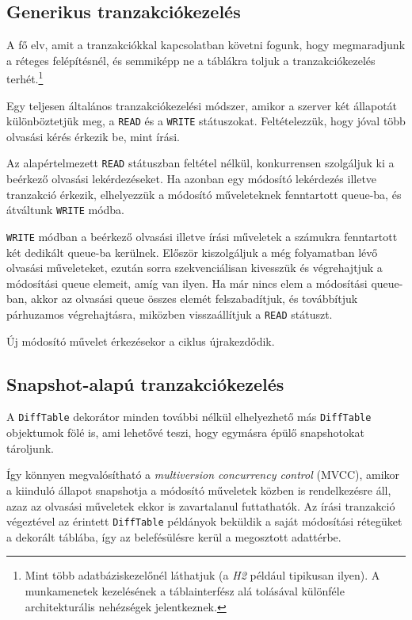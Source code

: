 \documentclass[
    parspace,
    noindent,
    nohyp,
]{elteiktdk}[2023/04/10]
\begin{document}
\subsection{Generikus tranzakciókezelés}

A fő elv, amit a tranzakciókkal kapcsolatban követni fogunk,
hogy megmaradjunk a réteges felépítésnél,
és semmiképp ne a táblákra toljuk a tranzakciókezelés terhét.\footnote{
    Mint több adatbáziskezelőnél láthatjuk (a \textit{H2} például tipikusan ilyen).
    A munkamenetek kezelésének a táblainterfész alá tolásával
    különféle architekturális nehézségek jelentkeznek.
}

Egy teljesen általános tranzakciókezelési módszer,
amikor a szerver két állapotát különböztetjük meg,
a \texttt{READ} és a \texttt{WRITE} státuszokat.
Feltételezzük, hogy jóval több olvasási kérés érkezik be, mint írási.

Az alapértelmezett \texttt{READ} státuszban feltétel nélkül, konkurrensen
szolgáljuk ki a beérkező olvasási lekérdezéseket.
Ha azonban egy módosító lekérdezés illetve tranzakció érkezik,
elhelyezzük a módosító műveleteknek fenntartott queue-ba,
és átváltunk \texttt{WRITE} módba.

\texttt{WRITE} módban a beérkező olvasási illetve írási műveletek
a számukra fenntartott két dedikált queue-ba kerülnek.
Először kiszolgáljuk a még folyamatban lévő olvasási műveleteket,
ezután sorra szekvenciálisan kivesszük és végrehajtjuk a módosítási queue elemeit, amíg van ilyen.
Ha már nincs elem a módosítási queue-ban,
akkor az olvasási queue összes elemét felszabadítjuk, és továbbítjuk párhuzamos végrehajtásra,
miközben visszaállítjuk a \texttt{READ} státuszt.

Új módosító művelet érkezésekor a ciklus újrakezdődik.

\subsection{Snapshot-alapú tranzakciókezelés}

A \texttt{DiffTable} dekorátor minden további nélkül elhelyezhető
más \texttt{DiffTable} objektumok fölé is, ami lehetővé teszi, hogy egymásra épülő snapshotokat tároljunk.

Így könnyen megvalósítható a \textit{multiversion concurrency control} (MVCC),
amikor a kiinduló állapot snapshotja a módosító műveletek közben is rendelkezésre áll,
azaz az olvasási műveletek ekkor is zavartalanul futtathatók.
Az írási tranzakció végeztével az érintett \texttt{DiffTable} példányok
beküldik a saját módosítási rétegüket a dekorált táblába,
így az belefésülésre kerül a megosztott adattérbe.
\end{document}

